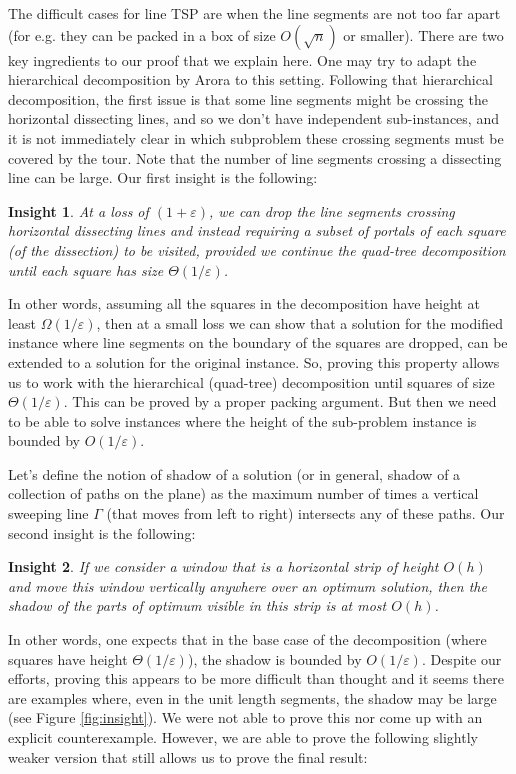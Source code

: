 \documentclass[pdflatex,sn-mathphys-num]{sn-jnl}
\theoremstyle{thmstyleone}
\newtheorem{insight}{Insight}
\newcommand{\eps}{\varepsilon}
\begin{document}
The difficult cases for line TSP are when the line segments are not too far apart (for e.g. they  can be packed in a box
of size $O(\sqrt{n})$ or smaller). There are two key ingredients to our proof that we explain here.
One may try to adapt the hierarchical decomposition by Arora \cite{Arora98} 
to this setting. Following that hierarchical decomposition,
the first issue is that some line segments might be crossing the horizontal dissecting lines, and so we don't have independent sub-instances, and it is not immediately clear in which subproblem these crossing segments must be covered by the tour. Note that 
the number of line segments crossing a dissecting line can be large.
Our first insight is the following:

\begin{insight}
    At a loss of $(1+\eps)$, we can drop the line segments crossing horizontal dissecting lines and instead requiring a subset of portals of each square (of the dissection) to be visited, provided 
    we continue the quad-tree decomposition until each square has size $\Theta(1/\eps)$.
\end{insight}

In other words, assuming all the squares in the decomposition have height at least $\Omega(1/\eps)$, then at a small loss we can show that a solution for the modified instance where line segments on the boundary of the squares are dropped, can be extended to a solution for the original instance. So, proving this property  allows us to work with the hierarchical (quad-tree) decomposition until squares of size $\Theta(1/\eps)$. This can be proved by a proper packing argument. But then we need to be able to solve instances where the height of the sub-problem instance is bounded by $O(1/\eps)$.

Let's define the notion of shadow of a solution (or in general, shadow of a collection of paths on the plane) as the maximum number of times a vertical sweeping line $\Gamma$ (that moves from left to right) intersects any of these paths. Our second insight is the following:

\begin{insight}
    If we consider a window that is a horizontal strip of height $O(h)$ and move this window 
    vertically anywhere over an optimum solution, then the shadow of the parts of optimum visible in this strip is at most $O(h)$.
\end{insight}

In other words, one expects that in the base case of the decomposition (where squares have height $\Theta(1/\eps)$), the shadow is bounded by $O(1/\eps)$. Despite our efforts, proving this appears to be more difficult than thought and it seems there are examples where, even in the unit length segments, the shadow may be large (see Figure \ref{fig:insight}). We were not able to prove this nor come up with an explicit counterexample.
However, we are able to prove the following slightly weaker version that still allows us to prove the final result:
\end{document}
